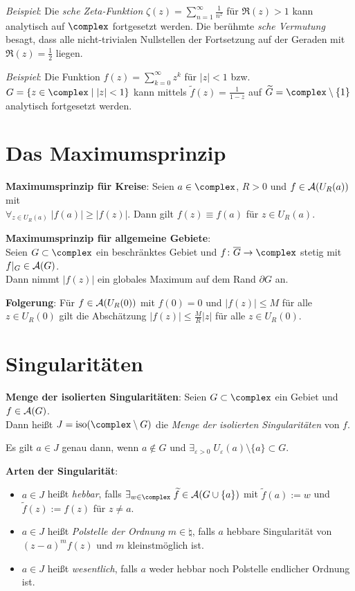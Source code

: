 \linie

\emph{Beispiel}:
Die \emph{sche Zeta-Funktion}
$\zeta(z) = \sum_{n=1}^\infty \frac{1}{n^z}$ für $\Re(z) > 1$ kann
analytisch auf $\complex$ fortgesetzt werden.
Die berühmte \emph{sche Vermutung} besagt, dass alle
nicht-trivialen Nullstellen
der Fortsetzung auf der Geraden mit $\Re(z) = \frac{1}{2}$ liegen.

\emph{Beispiel}:
Die Funktion $f(z) = \sum_{k=0}^\infty z^k$ für $|z| < 1$ bzw.
$G = \{z \in \complex \;|\; |z| < 1\}$ kann mittels
$\widetilde{f}(z) = \frac{1}{1 - z}$ auf
$\widetilde{G} = \complex \setminus \{1\}$ analytisch fortgesetzt werden.

\section{%
    Das Maximumsprinzip%
}

\textbf{Maximumsprinzip für Kreise}:
Seien $a \in \complex$, $R > 0$ und $f \in \mathcal{A}(U_R(a))$ mit\\
$\forall_{z \in U_R(a)}\; |f(a)| \ge |f(z)|$.
Dann gilt $f(z) \equiv f(a)$ für $z \in U_R(a)$.

\textbf{Maximumsprinzip für allgemeine Gebiete}:\\
Seien $G \subset \complex$ ein beschränktes Gebiet und
$f\colon \overline{G} \rightarrow \complex$ stetig mit $f|_G \in \mathcal{A}(G)$.\\
Dann nimmt $|f(z)|$ ein globales Maximum auf dem Rand $\partial G$ an.

\textbf{Folgerung}:
Für $f \in \mathcal{A}(U_R(0))$ mit $f(0) = 0$ und $|f(z)| \le M$ für alle
$z \in U_R(0)$ gilt die Abschätzung $|f(z)| \le \frac{M}{R} |z|$
für alle $z \in U_R(0)$.

\section{%
    Singularitäten%
}

\textbf{Menge der isolierten Singularitäten}:
Seien $G \subset \complex$ ein Gebiet und $f \in \mathcal{A}(G)$.\\
Dann heißt $J = \iso(\complex \setminus G)$ die
\emph{Menge der isolierten Singularitäten} von $f$.

Es gilt $a \in J$ genau dann, wenn
$a \notin G$ und
$\exists_{\varepsilon > 0}\; U_\varepsilon(a) \setminus \{a\} \subset G$.

\textbf{Arten der Singularität}:
\begin{itemize}
    \item
    $a \in J$ heißt \emph{hebbar}, falls
    $\exists_{w \in \complex}\; \widetilde{f} \in \A(G \cup \{a\})$ mit
    $\widetilde{f}(a) := w$ und $\widetilde{f}(z) := f(z)$ für $z \not= a$.

    \item
    $a \in J$ heißt \emph{Polstelle der Ordnung $m \in \natural$}, falls
    $a$ hebbare Singularität von $(z - a)^m f(z)$ und $m$ kleinstmöglich ist.

    \item
    $a \in J$ heißt \emph{wesentlich}, falls $a$ weder hebbar noch
    Polstelle endlicher Ordnung ist.
\end{itemize}

